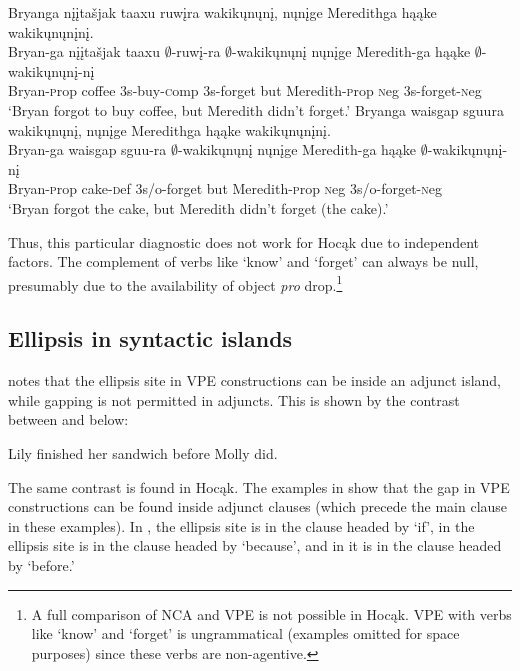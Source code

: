 \documentclass[output=paper]{LSP/langsci}
\begin{document}
\ea\label{ex:johnson:33}
\ea\label{ex:johnson:33a}
\glll Bryanga {nįįtašjak taaxu} ruwįra wakikųnųnį, nųnįge Meredithga hąąke wakikųnųnįnį.\\
Bryan-ga {nįįtašjak taaxu} $\emptyset$-ruwį-ra $\emptyset$-wakikųnųnį nųnįge Meredith-ga hąąke $\emptyset$-wakikųnųnį-nį\\
Bryan-{\textsc prop} coffee {\textsc 3s}-buy-{\textsc comp} {\textsc 3s}-forget but Meredith-{\textsc prop} {\textsc neg} {\textsc 3s}-forget-{\textsc neg}\\
\trans `Bryan forgot to buy coffee, but Meredith didn't forget.'
\ex\label{ex:johnson:33b}
\glll Bryanga {waisgap sguura} wakikųnųnį, nųnįge Meredithga hąąke wakikųnųnįnį.\\
Bryan-ga {waisgap sguu-ra} $\emptyset$-wakikųnųnį nųnįge Meredith-ga hąąke $\emptyset$-wakikųnųnį-nį\\
Bryan-{\textsc prop} cake-{\textsc def} {\textsc 3s/o}-forget but Meredith-{\textsc prop} {\textsc neg} {\textsc 3s/o}-forget-{\textsc neg}\\
\trans `Bryan forgot the cake, but Meredith didn't forget (the cake).'
\z
\z


Thus, this particular diagnostic does not work for Hocąk due to independent factors. The complement of verbs like `know' and `forget' can always be null, presumably due to the availability of object \emph{pro} drop.\footnote{A full comparison of NCA and VPE is not possible in Hocąk. VPE with verbs like `know' and `forget' is ungrammatical (examples omitted for space purposes) since these verbs are non-agentive.}

\subsection{Ellipsis in syntactic islands}\label{sec:johnson:3.3}

\citet{Goldberg2005} notes that the ellipsis site in VPE constructions can be inside an adjunct island, while gapping is not permitted in adjuncts. This is shown by the contrast between  and  below:

\ea
\ea\label{ex:johnson:34a}
Lily finished her sandwich before Molly did.
\label{ex:johnson:34b}
\z
\z

The same contrast is found in Hocąk. The examples in  show that the gap in VPE constructions can be found inside adjunct clauses (which precede the main clause in these examples). In , the ellipsis site is in the clause headed by `if', in  the ellipsis site is in the clause headed by `because', and in  it is in the clause headed by `before.'
\end{document}
